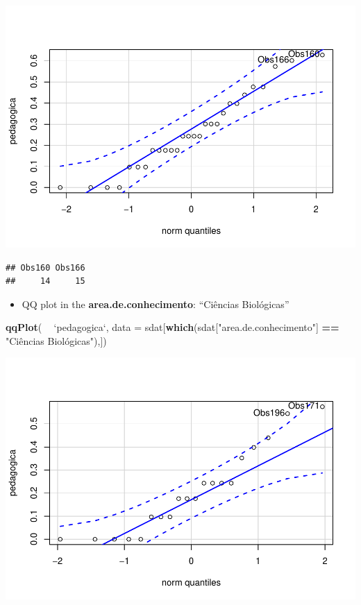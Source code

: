 \documentclass[]{article}
\newenvironment{Shaded}{\begin{snugshade}}{\end{snugshade}}
\newcommand{\DataTypeTok}[1]{\textcolor[rgb]{0.13,0.29,0.53}{#1}}
\newcommand{\KeywordTok}[1]{\textcolor[rgb]{0.13,0.29,0.53}{\textbf{#1}}}
\newcommand{\NormalTok}[1]{#1}
\newcommand{\OperatorTok}[1]{\textcolor[rgb]{0.81,0.36,0.00}{\textbf{#1}}}
\newcommand{\StringTok}[1]{\textcolor[rgb]{0.31,0.60,0.02}{#1}}
\providecommand{\tightlist}{%
  \setlength{\itemsep}{0pt}\setlength{\parskip}{0pt}}
\begin{document}
\includegraphics{factorialAnova_files/figure-latex/unnamed-chunk-25-1.pdf}

\begin{verbatim}
## Obs160 Obs166 
##     14     15
\end{verbatim}

\begin{itemize}
\tightlist
\item
  QQ plot in the \textbf{area.de.conhecimento}: ``Ciências Biológicas''
\end{itemize}

\begin{Shaded}
\begin{Highlighting}[]
\KeywordTok{qqPlot}\NormalTok{( }\OperatorTok{~}\StringTok{ `}\DataTypeTok{pedagogica}\StringTok{`}\NormalTok{, }\DataTypeTok{data =}\NormalTok{ sdat[}\KeywordTok{which}\NormalTok{(sdat[}\StringTok{"area.de.conhecimento"}\NormalTok{] }\OperatorTok{==}\StringTok{ "Ciências Biológicas"),])}
\end{Highlighting}
\end{Shaded}

\includegraphics{factorialAnova_files/figure-latex/unnamed-chunk-26-1.pdf}
\end{document}
